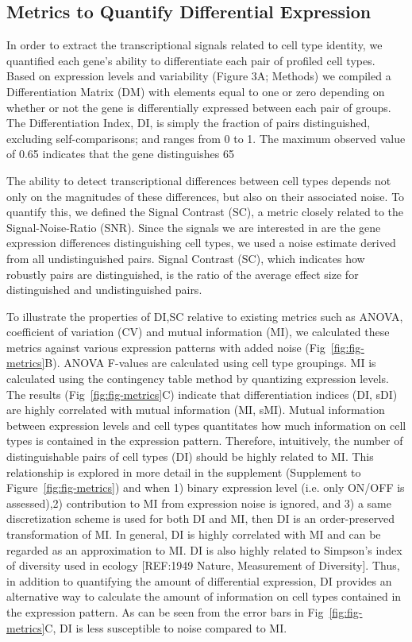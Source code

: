 \subsection{Metrics to Quantify Differential Expression}
In order to extract the transcriptional signals related to cell type identity, we quantified each gene's ability to differentiate each pair of profiled cell types. Based on expression levels and variability (Figure 3A; Methods) we compiled a Differentiation Matrix (DM) with elements equal to one or zero depending on whether or not the gene is differentially expressed between each pair of groups. The Differentiation Index, DI, is simply the fraction of pairs distinguished, excluding self-comparisons; and ranges from 0 to 1. The maximum observed value of 0.65 indicates that the gene distinguishes 65%

The ability to detect transcriptional differences between cell types depends not only on the magnitudes of these differences, but also on their associated noise. To quantify this, we defined the Signal Contrast (SC), a metric closely related to the Signal-Noise-Ratio (SNR). Since the signals we are interested in are the gene expression differences distinguishing cell types, we used a noise estimate derived from all undistinguished pairs. Signal Contrast (SC), which indicates how robustly pairs are distinguished, is the ratio of the average effect size for distinguished and undistinguished pairs. 

To illustrate the properties of DI,SC relative to existing metrics such as ANOVA, coefficient of variation (CV) and mutual information (MI), we calculated these metrics against various expression patterns with added noise (Fig~\ref{fig:fig-metrics}B). ANOVA F-values are calculated using cell type groupings. MI is calculated using the contingency table method by quantizing expression levels. 
The results (Fig~\ref{fig:fig-metrics}C) indicate that differentiation indices (DI, sDI) are highly correlated with mutual information (MI, sMI). Mutual information between expression levels and cell types quantitates how much information on cell types is contained in the expression pattern. Therefore, intuitively, the number of distinguishable pairs of cell types (DI) should be highly related to MI. This relationship is explored in more detail in the supplement (Supplement to Figure~\ref{fig:fig-metrics}) and when 1) binary expression level (i.e. only ON/OFF is assessed),2) contribution to MI from expression noise is ignored, and 3) a same discretization scheme is used for both DI and MI, then DI is an order-preserved transformation of MI. In general, DI is highly correlated with MI and can be regarded as an approximation to MI. DI is also highly related to Simpson's index of diversity used in ecology [REF:1949 Nature, Measurement of Diversity]. Thus, in addition to quantifying the amount of differential expression, DI provides an alternative way to calculate the amount of information on cell types contained in the expression pattern. As can be seen from the error bars in Fig~\ref{fig:fig-metrics}C, DI is less susceptible to noise compared to MI. 

